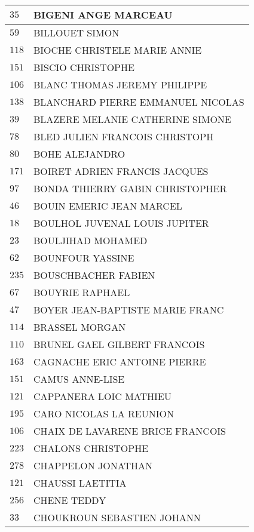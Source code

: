 \begin{xltabular}{\linewidth}{|l|X|}
    \hline
    $35$ & BIGENI ANGE MARCEAU \\
    \hline
    $59$ & BILLOUET SIMON \\
    \hline
    $118$ & BIOCHE CHRISTELE MARIE ANNIE \\
    \hline
    $151$ & BISCIO CHRISTOPHE \\
    \hline
    $106$ & BLANC THOMAS JEREMY PHILIPPE \\
    \hline
    $138$ & BLANCHARD PIERRE EMMANUEL NICOLAS \\
    \hline
    $39$ & BLAZERE MELANIE CATHERINE SIMONE \\
    \hline
    $78$ & BLED JULIEN FRANCOIS CHRISTOPH \\
    \hline
    $80$ & BOHE ALEJANDRO \\
    \hline
    $171$ & BOIRET ADRIEN FRANCIS JACQUES \\
    \hline
    $97$ & BONDA THIERRY GABIN CHRISTOPHER \\
    \hline
    $46$ & BOUIN EMERIC JEAN MARCEL \\
    \hline
    $18$ & BOULHOL JUVENAL LOUIS JUPITER \\
    \hline
    $23$ & BOULJIHAD MOHAMED \\
    \hline
    $62$ & BOUNFOUR YASSINE \\
    \hline
    $235$ & BOUSCHBACHER FABIEN \\
    \hline
    $67$ & BOUYRIE RAPHAEL \\
    \hline
    $47$ & BOYER JEAN-BAPTISTE MARIE FRANC \\
    \hline
    $114$ & BRASSEL MORGAN \\
    \hline
    $110$ & BRUNEL GAEL GILBERT FRANCOIS \\
    \hline
    $163$ & CAGNACHE ERIC ANTOINE PIERRE \\
    \hline
    $151$ & CAMUS ANNE-LISE \\
    \hline
    $121$ & CAPPANERA LOIC MATHIEU \\
    \hline
    $195$ & CARO NICOLAS LA REUNION \\
    \hline
    $106$ & CHAIX DE LAVARENE BRICE FRANCOIS \\
    \hline
    $223$ & CHALONS CHRISTOPHE \\
    \hline
    $278$ & CHAPPELON JONATHAN \\
    \hline
    $121$ & CHAUSSI LAETITIA \\
    \hline
    $256$ & CHENE TEDDY \\
    \hline
    $33$ & CHOUKROUN SEBASTIEN JOHANN \\

\end{xltabular}
